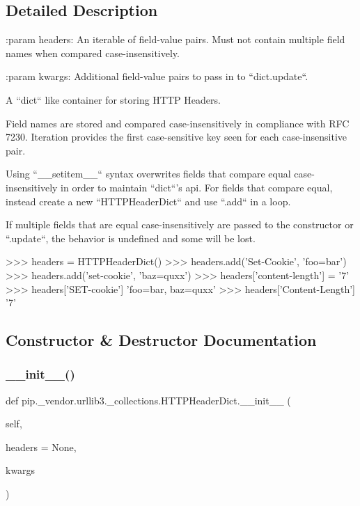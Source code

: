 \subsection{Detailed Description}
\begin{DoxyVerb}:param headers:
    An iterable of field-value pairs. Must not contain multiple field names
    when compared case-insensitively.

:param kwargs:
    Additional field-value pairs to pass in to ``dict.update``.

A ``dict`` like container for storing HTTP Headers.

Field names are stored and compared case-insensitively in compliance with
RFC 7230. Iteration provides the first case-sensitive key seen for each
case-insensitive pair.

Using ``__setitem__`` syntax overwrites fields that compare equal
case-insensitively in order to maintain ``dict``'s api. For fields that
compare equal, instead create a new ``HTTPHeaderDict`` and use ``.add``
in a loop.

If multiple fields that are equal case-insensitively are passed to the
constructor or ``.update``, the behavior is undefined and some will be
lost.

>>> headers = HTTPHeaderDict()
>>> headers.add('Set-Cookie', 'foo=bar')
>>> headers.add('set-cookie', 'baz=quxx')
>>> headers['content-length'] = '7'
>>> headers['SET-cookie']
'foo=bar, baz=quxx'
>>> headers['Content-Length']
'7'
\end{DoxyVerb}
 

\subsection{Constructor \& Destructor Documentation}
\mbox{\label{classpip_1_1__vendor_1_1urllib3_1_1__collections_1_1HTTPHeaderDict_aae62049ce21da994548fce43dcfcf6a6}} 
\subsubsection{\texorpdfstring{\+\_\+\+\_\+init\+\_\+\+\_\+()}{\_\_init\_\_()}}
{\footnotesize\ttfamily def pip.\+\_\+vendor.\+urllib3.\+\_\+collections.\+H\+T\+T\+P\+Header\+Dict.\+\_\+\+\_\+init\+\_\+\+\_\+ (\begin{DoxyParamCaption}\item[{}]{self,  }\item[{}]{headers = {\ttfamily None},  }\item[{}]{kwargs }\end{DoxyParamCaption})}



